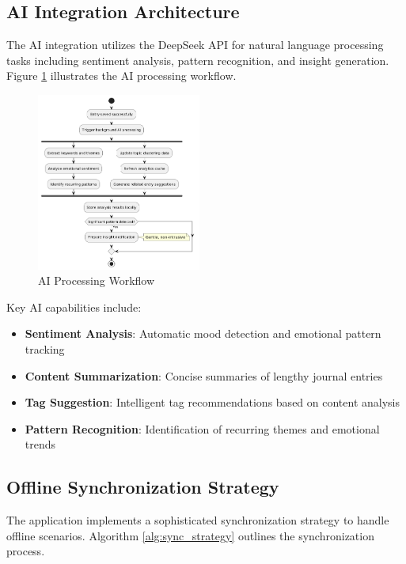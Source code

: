 \documentclass[conference]{IEEEtran}
\begin{document}
\subsection{AI Integration Architecture}

The AI integration utilizes the DeepSeek API for natural language processing tasks including sentiment analysis, pattern recognition, and insight generation. Figure \ref{fig:ai_processing} illustrates the AI processing workflow.

\begin{figure}[htbp]
\centerline{\includegraphics[width=0.48\textwidth]{ai_processing_flow.png}}
\caption{AI Processing Workflow}
\label{fig:ai_processing}
\end{figure}

Key AI capabilities include:
\begin{itemize}
\item \textbf{Sentiment Analysis}: Automatic mood detection and emotional pattern tracking
\item \textbf{Content Summarization}: Concise summaries of lengthy journal entries
\item \textbf{Tag Suggestion}: Intelligent tag recommendations based on content analysis
\item \textbf{Pattern Recognition}: Identification of recurring themes and emotional trends
\end{itemize}

\subsection{Offline Synchronization Strategy}

The application implements a sophisticated synchronization strategy to handle offline scenarios. Algorithm \ref{alg:sync_strategy} outlines the synchronization process.
\end{document}
